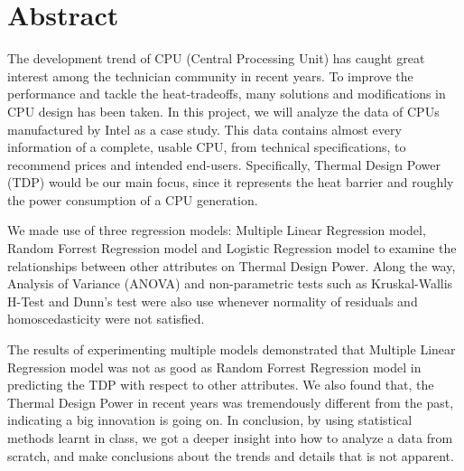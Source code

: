 %
%
%   
\section{Abstract}

The development trend of CPU (Central Processing Unit) has caught great interest among the technician
community in recent years. To improve the performance and tackle the heat-tradeoffs, many solutions
and modifications in CPU design has been taken. In this project, we will analyze the data of CPUs
manufactured by Intel as a case study. This data contains almost every information of a complete, usable
CPU, from technical specifications, to recommend prices and intended end-users. Specifically, Thermal Design Power (TDP)
would be our main focus, since it represents the heat barrier and roughly the power consumption of a CPU generation.

We made use of three regression models: Multiple Linear Regression model, Random Forrest Regression model and Logistic Regression
model to examine the relationships between other attributes on Thermal Design Power. Along the way, Analysis of Variance (ANOVA) and
non-parametric tests such as Kruskal-Wallis H-Test and Dunn's test were also use whenever normality of residuals and homoscedasticity
were not satisfied. 

The results of experimenting multiple models demonstrated that Multiple Linear Regression model was not as good as 
Random Forrest Regression model in predicting the TDP with respect to other attributes. We also found that, the Thermal Design Power in
recent years was tremendously different from the past, indicating a big innovation is going on. In conclusion, by using statistical methods
learnt in class, we got a deeper insight into how to analyze a data from scratch, and make conclusions about the trends and details that is
not apparent.